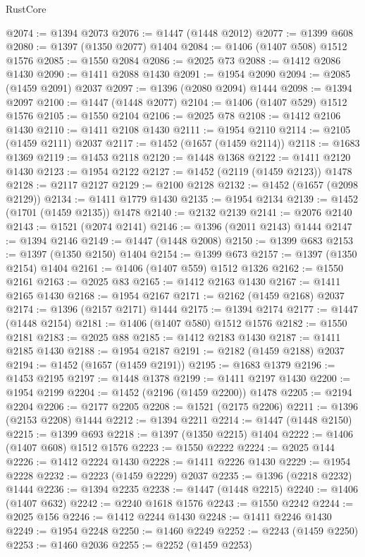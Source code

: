 \begin{lexlean}{RustCore}
\begin{coremodule}
{\begin{coremodule}
{{{{{{{{{{{{{{{{{{{{{{{{{{{{{{{{{{{{{{{{{{{{{@2074 := @1394 @2073
@2076 := @1447 (@1448 @2012)
@2077 := @1399 @608
@2080 := @1397 (@1350 @2077) @1404
@2084 := @1406 (@1407 @508) @1512 @1576
@2085 := @1550 @2084
@2086 := @2025 @73
@2088 := @1412 @2086 @1430
@2090 := @1411 @2088 @1430
@2091 := @1954 @2090
@2094 := @2085 (@1459 @2091) @2037
@2097 := @1396 (@2080 @2094) @1444
@2098 := @1394 @2097
@2100 := @1447 (@1448 @2077)
@2104 := @1406 (@1407 @529) @1512 @1576
@2105 := @1550 @2104
@2106 := @2025 @78
@2108 := @1412 @2106 @1430
@2110 := @1411 @2108 @1430
@2111 := @1954 @2110
@2114 := @2105 (@1459 @2111) @2037
@2117 := @1452 (@1657 (@1459 @2114))
@2118 := @1683 @1369
@2119 := @1453 @2118
@2120 := @1448 @1368
@2122 := @1411 @2120 @1430
@2123 := @1954 @2122
@2127 := @1452 (@2119 (@1459 @2123)) @1478
@2128 := @2117 @2127
@2129 := @2100 @2128
@2132 := @1452 (@1657 (@2098 @2129))
@2134 := @1411 @1779 @1430
@2135 := @1954 @2134
@2139 := @1452 (@1701 (@1459 @2135)) @1478
@2140 := @2132 @2139
@2141 := @2076 @2140
@2143 := @1521 (@2074 @2141)
@2146 := @1396 (@2011 @2143) @1444
@2147 := @1394 @2146
@2149 := @1447 (@1448 @2008)
@2150 := @1399 @683
@2153 := @1397 (@1350 @2150) @1404
@2154 := @1399 @673
@2157 := @1397 (@1350 @2154) @1404
@2161 := @1406 (@1407 @559) @1512 @1326
@2162 := @1550 @2161
@2163 := @2025 @83
@2165 := @1412 @2163 @1430
@2167 := @1411 @2165 @1430
@2168 := @1954 @2167
@2171 := @2162 (@1459 @2168) @2037
@2174 := @1396 (@2157 @2171) @1444
@2175 := @1394 @2174
@2177 := @1447 (@1448 @2154)
@2181 := @1406 (@1407 @580) @1512 @1576
@2182 := @1550 @2181
@2183 := @2025 @88
@2185 := @1412 @2183 @1430
@2187 := @1411 @2185 @1430
@2188 := @1954 @2187
@2191 := @2182 (@1459 @2188) @2037
@2194 := @1452 (@1657 (@1459 @2191))
@2195 := @1683 @1379
@2196 := @1453 @2195
@2197 := @1448 @1378
@2199 := @1411 @2197 @1430
@2200 := @1954 @2199
@2204 := @1452 (@2196 (@1459 @2200)) @1478
@2205 := @2194 @2204
@2206 := @2177 @2205
@2208 := @1521 (@2175 @2206)
@2211 := @1396 (@2153 @2208) @1444
@2212 := @1394 @2211
@2214 := @1447 (@1448 @2150)
@2215 := @1399 @693
@2218 := @1397 (@1350 @2215) @1404
@2222 := @1406 (@1407 @608) @1512 @1576
@2223 := @1550 @2222
@2224 := @2025 @144
@2226 := @1412 @2224 @1430
@2228 := @1411 @2226 @1430
@2229 := @1954 @2228
@2232 := @2223 (@1459 @2229) @2037
@2235 := @1396 (@2218 @2232) @1444
@2236 := @1394 @2235
@2238 := @1447 (@1448 @2215)
@2240 := @1406 (@1407 @632)
@2242 := @2240 @1618 @1576
@2243 := @1550 @2242
@2244 := @2025 @156
@2246 := @1412 @2244 @1430
@2248 := @1411 @2246 @1430
@2249 := @1954 @2248
@2250 := @1460 @2249
@2252 := @2243 (@1459 @2250)
@2253 := @1460 @2036
@2255 := @2252 (@1459 @2253)
}}}}}}}}}}}}}}}}}}}}}}}}}}}}}}}}}}}}}}}}}}}}}
\end{coremodule}}
\end{coremodule}
\end{lexlean}
